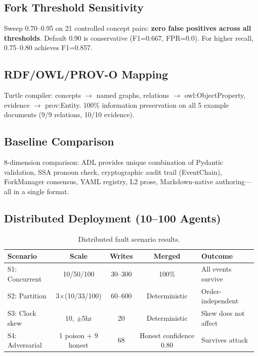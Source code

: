 \documentclass[11pt,a4paper]{article}
\theoremstyle{remark}
\begin{document}
\subsection{Fork Threshold Sensitivity}

Sweep 0.70--0.95 on 21 controlled concept pairs: \textbf{zero false positives across all thresholds}. Default 0.90 is conservative (F1=0.667, FPR=0.0). For higher recall, 0.75--0.80 achieves F1=0.857.

\subsection{RDF/OWL/PROV-O Mapping}

Turtle compiler: concepts $\to$ named graphs, relations $\to$ owl:ObjectProperty, evidence $\to$ prov:Entity. 100\% information preservation on all 5 example documents (9/9 relations, 10/10 evidence).

\subsection{Baseline Comparison}

8-dimension comparison: ADL provides unique combination of Pydantic validation, SSA pronoun check, cryptographic audit trail (EventChain), ForkManager consensus, YAML registry, L2 prose, Markdown-native authoring---all in a single format.

\subsection{Distributed Deployment (10--100 Agents)}

\begin{table}[h]\centering\caption{Distributed fault scenario results.}\label{tab:dist}
\begin{tabular}{lcccl}
\toprule Scenario & Scale & Writes & Merged & Outcome \\
\midrule
S1: Concurrent & 10/50/100 & 30--300 & 100\% & All events survive \\
S2: Partition  & 3$\times$(10/33/100) & 60--600 & Deterministic & Order-independent \\
S3: Clock skew & 10, $\pm$5hr & 20 & Deterministic & Skew does not affect \\
S4: Adversarial & 1 poison + 9 honest & 68 & Honest confidence 0.80 & Survives attack \\
\bottomrule
\end{tabular}\end{table}
\end{document}

